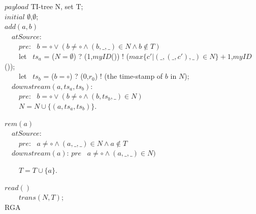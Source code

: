 \renewcommand{\algorithmcfname}{CRDT Implementation}
\noindent
\noindent\begin{algorithm}[H]
$\mathit{payload}$ TI-tree N, set T; \\
$\mathit{initial}$ $\emptyset$,$\emptyset$; \\

$add(a,b)$ \\
\ \ $\mathit{atSource}$: \\
\ \ \ \ $\mathit{pre}$: \ $b = \circ \vee ( b \neq \circ \wedge (b,\_,\_) \in N \wedge b \notin T)$ \\



\ \ \ \ let \ $ts_a$ = ($N = \emptyset$) ? (1,$\mathit{myID}$()) ! ($\mathit{max}\{ c' \vert (\_,(\_,c'),\_) \in N \} +1$,$\mathit{myID}$()); \\
\ \ \ \ let \ $ts_b$ = ($b = \circ$) ? (0,$r_0$) ! (the time-stamp of $b$ in $N$); \\

\ \ $\mathit{downstream}(a,ts_a,ts_b)$: \\
\ \ \ \ $\mathit{pre}$: \ $b = \circ \vee ( b \neq \circ \wedge (b,ts_b,\_) \in N)$ \\

\ \ \ \ $N = N \cup \{ (a,ts_a,ts_b) \}$.


$rem(a)$ \\
\ \ $\mathit{atSource}$: \\
\ \ \ \ $\mathit{pre}$: \ $a \neq \circ \wedge (a,\_,\_) \in N \wedge a \notin T$ \\

\ \ $\mathit{downstream}(a)$: $\mathit{pre}$ \ $a \neq \circ \wedge (a,\_,\_) \in N)$

\ \ \ \ $T = T \cup \{ a \}$.

$read()$ \\
\ \ \ \ \KwRet $\mathit{trans}(N,T)$; \\

\caption{RGA}
\label{Method1}
\end{algorithm}

